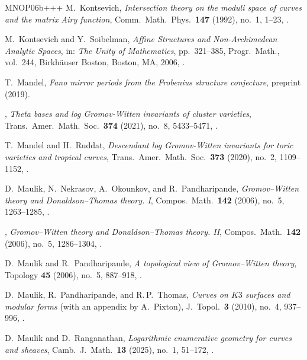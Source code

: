\begin{thebibliography}{MNOP06b+++}
M.~Kontsevich, \emph{Intersection theory on the moduli space of curves and the
  matrix Airy function}, Comm.\ Math.\ Phys.\ \textbf{147} (1992), no.~1, 
1--23, .
  
M.~Kontsevich and Y.~Soibelman, \emph{Affine Structures and Non-{A}rchimedean
  Analytic Spaces}, in: \emph{The Unity of Mathematics}, pp.~321--385, Progr.\ Math., vol.~244, Birkh\"{a}user Boston, Boston, MA, 2006, .

T.~Mandel, \emph{Fano mirror periods from the Frobenius structure conjecture},
   preprint  (2019).

\bysame, \emph{Theta bases and log {G}romov-{W}itten invariants of cluster
  varieties}, Trans.\ Amer.\ Math.\ Soc.\ \textbf{374} (2021), no.~8, 
5433--5471,  .

T.~Mandel and H.~Ruddat, \emph{Descendant log {G}romov-{W}itten invariants for
  toric varieties and tropical curves}, Trans.\ Amer.\ Math.\ Soc.\ \textbf{373}
  (2020), no.~2, 1109--1152, .

D.~Maulik, N.~Nekrasov, A.~Okounkov, and R.~Pandharipande,
  \emph{Gromov--{W}itten theory and {D}onaldson--{T}homas theory. {I}}, Compos.\
  Math.\ \textbf{142} (2006), no.~5, 1263--1285,
  .

\bysame, \emph{Gromov--{W}itten theory and {D}onaldson--{T}homas theory. {II}},
  Compos.\ Math.\ \textbf{142} (2006), no.~5, 
1286--1304,  .

D.~Maulik and R.~Pandharipande, \emph{A topological view of {G}romov--{W}itten
  theory}, Topology \textbf{45} (2006), no.~5, 
887--918,  .

D.~Maulik, R.~Pandharipande, and R.\,P.~Thomas, \emph{Curves on {$K3$} surfaces
  and modular forms} (with an appendix by A.~Pixton), J.~Topol.\ \textbf{3} (2010), no.~4, 937--996, .

D.~Maulik and D.~Ranganathan, \emph{Logarithmic enumerative geometry for curves
and sheaves}, Camb.~J.\ Math.\ \textbf{13} (2025), no.~1, 51--172, .


\end{thebibliography}
